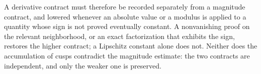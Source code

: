 A derivative contract must therefore be recorded separately from a magnitude
contract, and lowered whenever an absolute value or a modulus is applied to a
quantity whose sign is not proved eventually constant. A nonvanishing proof on
the relevant neighborhood, or an exact factorization that exhibits the sign,
restores the higher contract; a Lipschitz constant alone does not. Neither does
the accumulation of cusps contradict the magnitude estimate: the two contracts
are independent, and only the weaker one is preserved.
